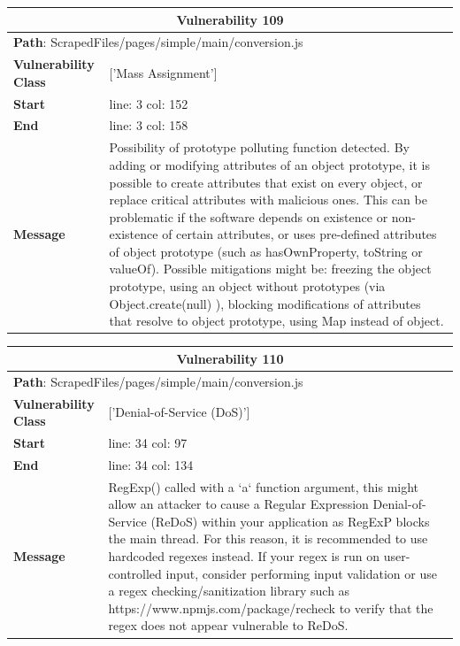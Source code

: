 \documentclass[12pt]{article}
\begin{document}
\vspace{0.7cm}
\FloatBarrier
\begin{table}[!h]
\centering
\renewcommand{\arraystretch}{1.3}
\begin{tabular}{|l|p{10cm}|}
\hline
\multicolumn{2}{|c|}{\textbf{Vulnerability 109}} \\
\hline
\multicolumn{2}{|l|}{\textbf{Path}: ScrapedFiles/pages/simple/main/conversion.js} \\
\hline
\textbf{Vulnerability Class} & ['Mass Assignment'] \\
\hline
\textbf{Start} & line: 3 \quad col: 152 \\
\hline
\textbf{End} & line: 3 \quad col: 158 \\
\hline
\textbf{Message} & Possibility of prototype polluting function detected. By adding or modifying attributes of an object prototype, it is possible to create attributes that exist on every object, or replace critical attributes with malicious ones. This can be problematic if the software depends on existence or non-existence of certain attributes, or uses pre-defined attributes of object prototype (such as hasOwnProperty, toString or valueOf). Possible mitigations might be: freezing the object prototype, using an object without prototypes (via Object.create(null) ), blocking modifications of attributes that resolve to object prototype, using Map instead of object. \\
\hline
\end{tabular}
\end{table}
\vspace{0.7cm}
\FloatBarrier
\begin{table}[!h]
\centering
\renewcommand{\arraystretch}{1.3}
\begin{tabular}{|l|p{10cm}|}
\hline
\multicolumn{2}{|c|}{\textbf{Vulnerability 110}} \\
\hline
\multicolumn{2}{|l|}{\textbf{Path}: ScrapedFiles/pages/simple/main/conversion.js} \\
\hline
\textbf{Vulnerability Class} & ['Denial-of-Service (DoS)'] \\
\hline
\textbf{Start} & line: 34 \quad col: 97 \\
\hline
\textbf{End} & line: 34 \quad col: 134 \\
\hline
\textbf{Message} & RegExp() called with a `a` function argument, this might allow an attacker to cause a Regular Expression Denial-of-Service (ReDoS) within your application as RegExP blocks the main thread. For this reason, it is recommended to use hardcoded regexes instead. If your regex is run on user-controlled input, consider performing input validation or use a regex checking/sanitization library such as https://www.npmjs.com/package/recheck to verify that the regex does not appear vulnerable to ReDoS. \\
\hline
\end{tabular}
\end{table}
\end{document}
